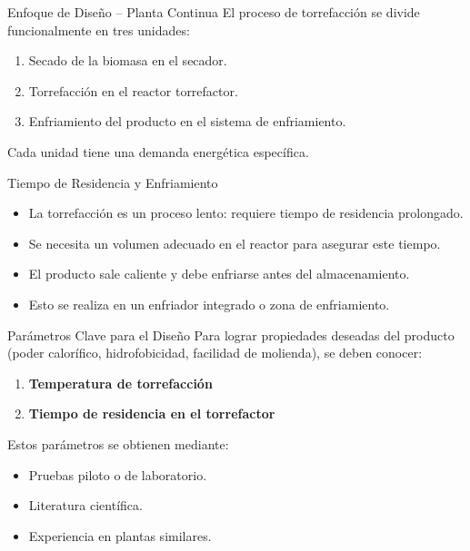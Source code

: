 \documentclass[main.tex]{subfiles}
\begin{document}
\begin{frame}{Enfoque de Diseño – Planta Continua}
  El proceso de torrefacción se divide funcionalmente en tres unidades:

  \begin{enumerate}
    \item Secado de la biomasa en el secador.
    \item Torrefacción en el reactor torrefactor.
    \item Enfriamiento del producto en el sistema de enfriamiento.
  \end{enumerate}

  Cada unidad tiene una demanda energética específica.
\end{frame}

\begin{frame}{Tiempo de Residencia y Enfriamiento}
  \begin{itemize}
    \item La torrefacción es un proceso lento: requiere tiempo de residencia prolongado.
    \item Se necesita un volumen adecuado en el reactor para asegurar este tiempo.
    \item El producto sale caliente y debe enfriarse antes del almacenamiento.
    \item Esto se realiza en un enfriador integrado o zona de enfriamiento.
  \end{itemize}
\end{frame}

\begin{frame}{Parámetros Clave para el Diseño}
  Para lograr propiedades deseadas del producto (poder calorífico, hidrofobicidad, facilidad de molienda), se deben conocer:

  \begin{enumerate}
    \item \textbf{Temperatura de torrefacción}
    \item \textbf{Tiempo de residencia en el torrefactor}
  \end{enumerate}

  Estos parámetros se obtienen mediante:
  \begin{itemize}
    \item Pruebas piloto o de laboratorio.
    \item Literatura científica.
    \item Experiencia en plantas similares.
  \end{itemize}
\end{frame}
\end{document}
